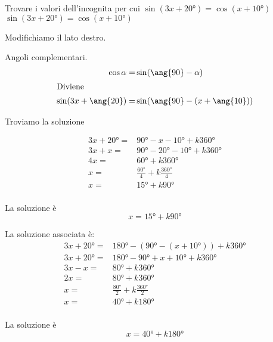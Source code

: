 \begin{exercise}
	Trovare i valori dell'incognita per cui $\sin(3x+\ang{20})=\cos(x+\ang{10})$
	\tcblower
	$\sin(3x+\ang{20})=\cos(x+\ang{10})$
	
	Modifichiamo il lato destro. 
	
	Angoli complementari. 
	\begin{align*}
	\cos\alpha=&\sin(\ang{90}-\alpha)\\
	\intertext{Diviene}
	\sin(3x+\ang{20})=&\sin(\ang{90}-(x+\ang{10}))
	\end{align*}	
	
	Troviamo la soluzione
	
	\begin{align*}
	3x+\ang{20}=&\ang{90}-x-\ang{10}+k\ang{360}\\
	3x+x=&\ang{90}-\ang{20}-\ang{10}+k\ang{360}\\
	4x=&\ang{60}+k\ang{360}\\
	x=&\frac{\ang{60}}{4}+k\frac{\ang{360}}{4}\\
	x=&\ang{15}+k\ang{90}\\
	\end{align*}
	
	La soluzione è
	\[x=\ang{15}+k\ang{90}\]
	
	La soluzione associata è:
	\begin{align*}
	3x+\ang{20}=&\ang{180}-(\ang{90}-(x+\ang{10}))+k\ang{360}\\
	3x+\ang{20}=&\ang{180}-\ang{90}+x+\ang{10}+k\ang{360}\\
	3x-x=&\ang{80}+k\ang{360}\\
	2x=&\ang{80}+k\ang{360}\\
	x=&\frac{\ang{80}}{2}+k\frac{\ang{360}}{2}\\
	x=&\ang{40}+k\ang{180}\\
	\end{align*}
	
	La soluzione è
	\[x=\ang{40}+k\ang{180}\]
\end{exercise}

